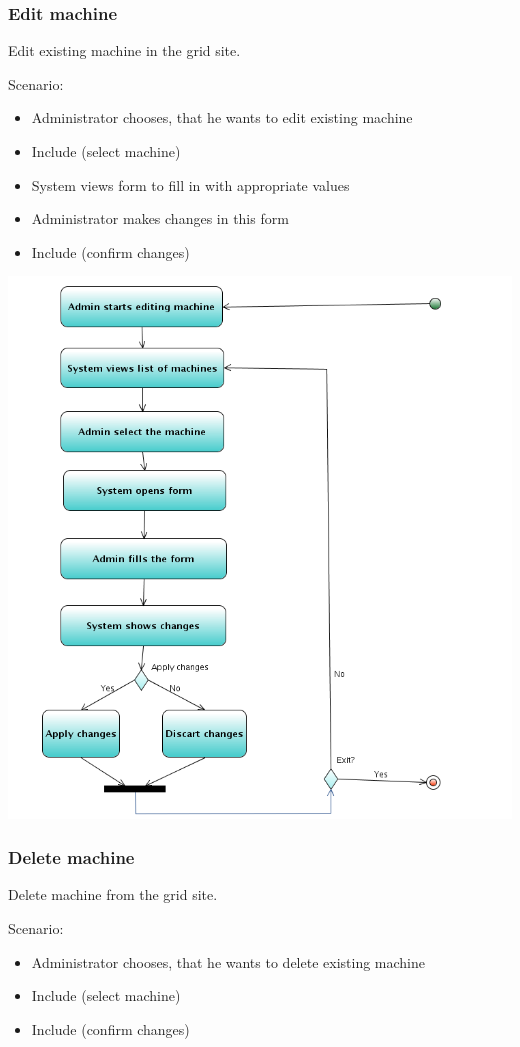 \documentclass[12pt]{article}
\begin{document}
\subsubsection{Edit machine}
Edit existing machine in the grid site.

Scenario:
\begin{itemize}
\item{Administrator chooses, that he wants to edit existing machine}
\item{Include (select machine)}
\item{System views form to fill in with appropriate values}
\item{Administrator makes changes in this form}
\item{Include (confirm changes)}
\end{itemize}

\includegraphics[width=\linewidth]{EditM.png}


\subsubsection{Delete machine}
Delete machine from the grid site.

Scenario:
\begin{itemize}
\item{Administrator chooses, that he wants to delete existing machine}
\item{Include (select machine)}
\item{Include (confirm changes)}
\end{itemize}
\end{document}
